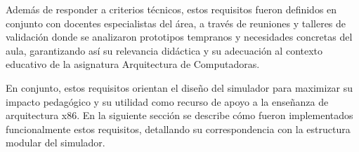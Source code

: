 \documentclass[12pt,oneside]{templates/unerthesis}
\begin{document}
\begin{table}[!h]
\centering
\caption{\label{tab:tablafuncionales}Requisitos funcionales y componentes del simulador}
\centering
{}
\end{table}

Además de responder a criterios técnicos, estos requisitos fueron definidos en conjunto con docentes especialistas del área, a través de reuniones y talleres de validación donde se analizaron prototipos tempranos y necesidades concretas del aula, garantizando así su relevancia didáctica y su adecuación al contexto educativo de la asignatura Arquitectura de Computadoras.

En conjunto, estos requisitos orientan el diseño del simulador para maximizar su impacto pedagógico y su utilidad como recurso de apoyo a la enseñanza de arquitectura x86. En la siguiente sección se describe cómo fueron implementados funcionalmente estos requisitos, detallando su correspondencia con la estructura modular del simulador.
\end{document}
